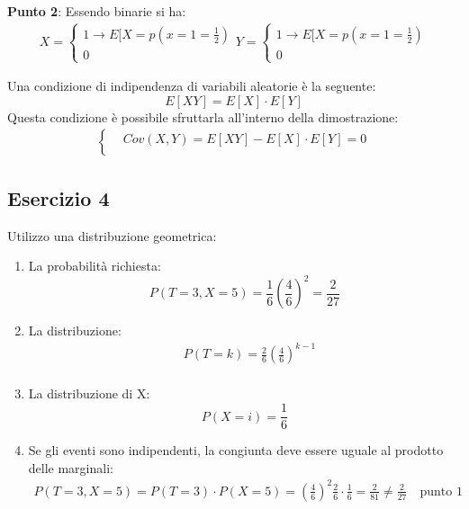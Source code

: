 \documentclass[12pt]{article}
\begin{document}
{\bf{Punto 2}}: \newline
Essendo binarie si ha:
\begin{align*}
    X = 
    \begin{cases}
        1 \rightarrow E[X = p(x=1 = \frac{1}{2}) \\
        0
    \end{cases}        
    Y = 
    \begin{cases}
        1 \rightarrow E[X = p(x=1 = \frac{1}{2}) \\
        0
    \end{cases}        
\end{align*}

Una condizione di indipendenza di variabili aleatorie è la seguente:
\[
E[XY] = E[X]\cdot E[Y]    
\]
Questa condizione è possibile sfruttarla all'interno della dimostrazione:
\begin{align*}
    \begin{cases}
        &Cov(X,Y) = E[XY] - E[X]\cdot E[Y]  = 0\\
    \end{cases}
\end{align*}

\subsection*{Esercizio 4}
Utilizzo una distribuzione geometrica:
\begin{enumerate}
    \item La probabilità richiesta:
    \[
        P(T = 3, X = 5) = \frac{1}{6}\left( \frac{4}{6}\right)^2 = \frac{2}{27}  
    \]
    \item La distribuzione: 
    \begin{align*}
        &P(T=k) = \frac{2}{6} \left(\frac{4}{6}\right)^{k-1} \\
    \end{align*}
    \item La distribuzione di X:
    \[
        P(X=i) = \frac{1}{6}
    \]
    \item Se gli eventi sono indipendenti, la congiunta deve essere uguale al prodotto delle marginali:
    \begin{align*}
        P(T=3, X=5) = P(T = 3) \cdot P(X = 5) = \left(\frac{4}{6}\right)^2 \frac{2}{6} \cdot \frac{1}{6} = \frac{2}{81} \neq \frac{2}{27} \quad \text{punto 1} 
    \end{align*} 
\end{enumerate}
\end{document}
